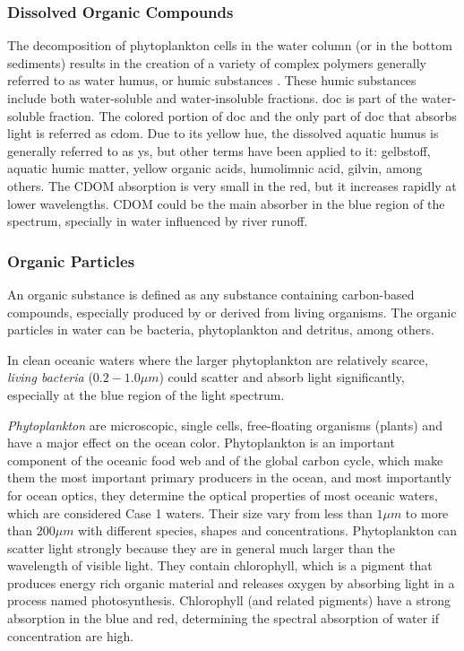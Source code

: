 \subsubsection*{Dissolved Organic Compounds}
The decomposition of phytoplankton cells in the water column (or in the bottom sediments) results in the creation of a variety of complex polymers generally referred to as water humus, or humic substances \cite{Bukata1995}. These humic substances include both water-soluble and water-insoluble fractions. \Gls{doc} is part of the water-soluble fraction.  The colored portion of \gls{doc} and the only part of \gls{doc} that absorbs light is referred as \acrfull{cdom}. Due to its yellow hue, the dissolved aquatic humus is generally referred to as \gls{ys}, but other terms have been applied to it: gelbstoff, aquatic humic matter, yellow organic acids, humolimnic acid, gilvin, among others. The CDOM absorption is very small in the red, but it increases rapidly at lower wavelengths. CDOM could be the main absorber in the blue region of the spectrum, specially in water influenced by river runoff.
\subsubsection*{Organic Particles}
An organic substance is defined as any substance containing carbon-based compounds, especially produced by or derived from living organisms. The organic particles in water can be bacteria, phytoplankton and detritus, among others.

In clean oceanic waters where the larger phytoplankton are relatively scarce, {\it living bacteria} ($0.2-1.0\mu m$) could scatter and absorb light significantly, especially at the blue region of the light spectrum.

{\it Phytoplankton} are microscopic, single cells, free-floating organisms (plants) and have a major effect on the ocean color. Phytoplankton is an important component of the oceanic food web and of the global carbon cycle, which make them the most important primary producers in the ocean, and most importantly for ocean optics, they determine the optical properties of most oceanic waters, which are considered Case 1 waters. Their size vary from less than $1\mu m$ to more than $200\mu m$ with different species, shapes and concentrations. Phytoplankton can scatter light strongly because they are in general much larger than the wavelength of visible light. They contain chlorophyll, which is a pigment that produces energy rich organic material and releases oxygen by absorbing light in a process named photosynthesis. Chlorophyll (and related pigments) have a strong absorption in the blue and red, determining the spectral absorption of water if concentration are high.

